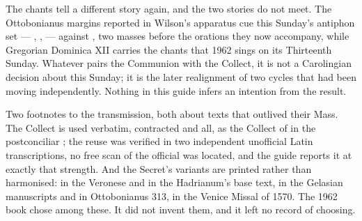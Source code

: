 The chants tell a different story again, and the two stories do not meet. The
Ottobonianus margins reported in Wilson's apparatus cue this Sunday's antiphon
set --- , ,
 --- against , two
masses before the orations they now accompany, while Gregorian Dominica XII
carries the chants that 1962 sings on its Thirteenth Sunday. Whatever pairs the
 Communion with the  Collect,
it is not a Carolingian decision about this Sunday; it is the later realignment
of two cycles that had been moving independently. Nothing in this guide infers
an intention from the result.

Two footnotes to the transmission, both about texts that outlived their Mass.
The Collect is used verbatim, contracted  and all, as the Collect
of  in the postconciliar ; the reuse was verified in two independent unofficial Latin
transcriptions, no free scan of the official  was
located, and the guide reports it at exactly that strength. And the Secret's
variants are printed rather than harmonised:  in the
Veronese and in the Hadrianum's base text,  in the Gelasian
manuscripts and in Ottobonianus 313,  in the
Venice Missal of 1570. The 1962 book chose among these. It did not invent them,
and it left no record of choosing.
